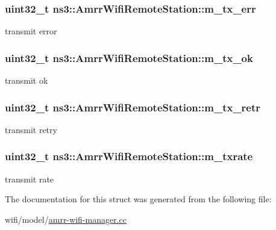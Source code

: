 \subsubsection[{\texorpdfstring{m\+\_\+tx\+\_\+err}{m_tx_err}}]{\setlength{\rightskip}{0pt plus 5cm}uint32\+\_\+t ns3\+::\+Amrr\+Wifi\+Remote\+Station\+::m\+\_\+tx\+\_\+err}\hypertarget{structns3_1_1AmrrWifiRemoteStation_ad47607d52d697b501554d76d3545396c}{}\label{structns3_1_1AmrrWifiRemoteStation_ad47607d52d697b501554d76d3545396c}


transmit error 

\subsubsection[{\texorpdfstring{m\+\_\+tx\+\_\+ok}{m_tx_ok}}]{\setlength{\rightskip}{0pt plus 5cm}uint32\+\_\+t ns3\+::\+Amrr\+Wifi\+Remote\+Station\+::m\+\_\+tx\+\_\+ok}\hypertarget{structns3_1_1AmrrWifiRemoteStation_ae02ed58bfa7c06422b6f22df79479f48}{}\label{structns3_1_1AmrrWifiRemoteStation_ae02ed58bfa7c06422b6f22df79479f48}


transmit ok 

\subsubsection[{\texorpdfstring{m\+\_\+tx\+\_\+retr}{m_tx_retr}}]{\setlength{\rightskip}{0pt plus 5cm}uint32\+\_\+t ns3\+::\+Amrr\+Wifi\+Remote\+Station\+::m\+\_\+tx\+\_\+retr}\hypertarget{structns3_1_1AmrrWifiRemoteStation_aeab8f20bfe93934c9e7e89deeed6a9f8}{}\label{structns3_1_1AmrrWifiRemoteStation_aeab8f20bfe93934c9e7e89deeed6a9f8}


transmit retry 

\subsubsection[{\texorpdfstring{m\+\_\+txrate}{m_txrate}}]{\setlength{\rightskip}{0pt plus 5cm}uint32\+\_\+t ns3\+::\+Amrr\+Wifi\+Remote\+Station\+::m\+\_\+txrate}\hypertarget{structns3_1_1AmrrWifiRemoteStation_ac2278b11fa5618edb3d520373566830b}{}\label{structns3_1_1AmrrWifiRemoteStation_ac2278b11fa5618edb3d520373566830b}


transmit rate 



The documentation for this struct was generated from the following file\+:\begin{DoxyCompactItemize}
\item 
wifi/model/\hyperlink{amrr-wifi-manager_8cc}{amrr-\/wifi-\/manager.\+cc}\end{DoxyCompactItemize}
